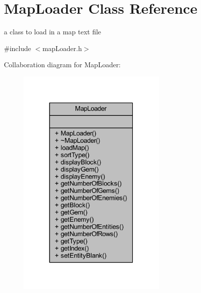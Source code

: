 \hypertarget{class_map_loader}{\section{Map\+Loader Class Reference}
\label{class_map_loader}
}


a class to load in a map text file  




{\ttfamily \#include $<$map\+Loader.\+h$>$}



Collaboration diagram for Map\+Loader\+:
\nopagebreak
\begin{figure}[H]
\begin{center}
\leavevmode
\includegraphics[width=207pt]{class_map_loader__coll__graph}
\end{center}
\end{figure}
